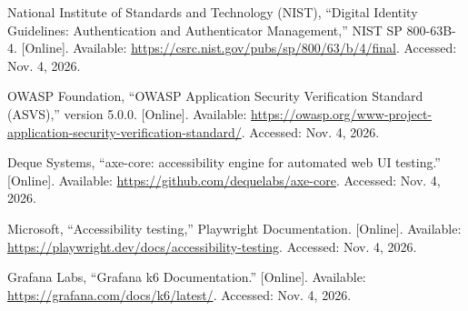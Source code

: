 \begin{enumerate}[label={[\arabic*]},leftmargin=2.2em,itemsep=6pt]
\item National Institute of Standards and Technology (NIST), ``Digital Identity Guidelines: Authentication and Authenticator Management,'' NIST SP 800-63B-4. [Online]. Available: \url{https://csrc.nist.gov/pubs/sp/800/63/b/4/final}. Accessed: Nov. 4, 2026.

\item OWASP Foundation, ``OWASP Application Security Verification Standard (ASVS),'' version 5.0.0. [Online]. Available: \url{https://owasp.org/www-project-application-security-verification-standard/}. Accessed: Nov. 4, 2026.

\item Deque Systems, ``axe-core: accessibility engine for automated web UI testing.'' [Online]. Available: \url{https://github.com/dequelabs/axe-core}. Accessed: Nov. 4, 2026.

\item Microsoft, ``Accessibility testing,'' Playwright Documentation. [Online]. Available: \url{https://playwright.dev/docs/accessibility-testing}. Accessed: Nov. 4, 2026.

\item Grafana Labs, ``Grafana k6 Documentation.'' [Online]. Available: \url{https://grafana.com/docs/k6/latest/}. Accessed: Nov. 4, 2026.

\end{enumerate}
\endgroup

